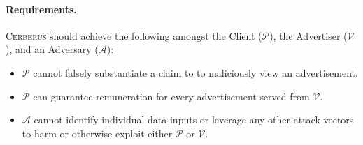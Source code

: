 \documentclass{article}
\begin{document}
	\paragraph{Requirements.}  \textsc{Cerberus} should achieve the following amongst the Client ($\mathcal{P}$), the Advertiser ($\mathcal{V}$), and an Adversary ($\mathcal{A}$):
			
			\begin{itemize}[label = $\cdot$]
				
				\item $\mathcal{P}$ cannot falsely substantiate a claim to to maliciously view an advertisement.
				\item $\mathcal{P}$ can guarantee remuneration for every advertisement served from  $\mathcal{V}$.
				\item $\mathcal{A}$ cannot identify individual data-inputs or leverage any other attack vectors to harm or otherwise exploit either $\mathcal{P}$ or $\mathcal{V}$.
				
			\end{itemize}
		
\end{document}
